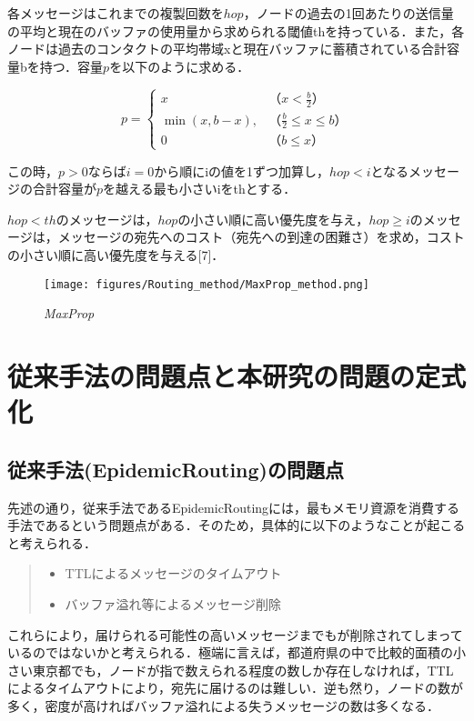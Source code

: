 \documentclass[11pt]{icsthesis}
\begin{document}
各メッセージはこれまでの複製回数を$hop$，ノードの過去の1回あたりの送信量の平均と現在のバッファの使用量から求められる閾値thを持っている．また，各ノードは過去のコンタクトの平均帯域xと現在バッファに蓄積されている合計容量bを持つ．容量$p$を以下のように求める．

\[
p =
\begin{cases}
    x & （ x < \frac{b}{2} ） \\
    \min(x, b - x), & （ \frac{b}{2} \leq x \leq b ） \\
    0 & （ b \leq x ）
\end{cases}
\]

この時，$p > 0$ならば$i=0$から順にiの値を1ずつ加算し，$hop < i$となるメッセージの合計容量が$p$を越える最も小さいiをthとする．

$hop < th$のメッセージは，$hop$の小さい順に高い優先度を与え，$hop \geq i$のメッセージは，メッセージの宛先へのコスト（宛先への到達の困難さ）を求め，コストの小さい順に高い優先度を与える[7]．

\begin{figure}[h]
	\centering
	\texttt{[image: figures/Routing\_method/MaxProp\_method.png]}
	\caption[]{\it{MaxProp}}
	\label{MaxProp}
\end{figure}

\chapter{従来手法の問題点と本研究の問題の定式化}
\section{従来手法(EpidemicRouting)の問題点}
先述の通り，従来手法であるEpidemicRoutingには，最もメモリ資源を消費する手法であるという問題点がある．そのため，具体的に以下のようなことが起こると考えられる．
\begin{quote}
\begin{itemize}
\item TTLによるメッセージのタイムアウト
\item バッファ溢れ等によるメッセージ削除
\end{itemize}
\end{quote}
これらにより，届けられる可能性の高いメッセージまでもが削除されてしまっているのではないかと考えられる．極端に言えば，都道府県の中で比較的面積の小さい東京都でも，ノードが指で数えられる程度の数しか存在しなければ，TTLによるタイムアウトにより，宛先に届けるのは難しい．逆も然り，ノードの数が多く，密度が高ければバッファ溢れによる失うメッセージの数は多くなる．
\end{document}
